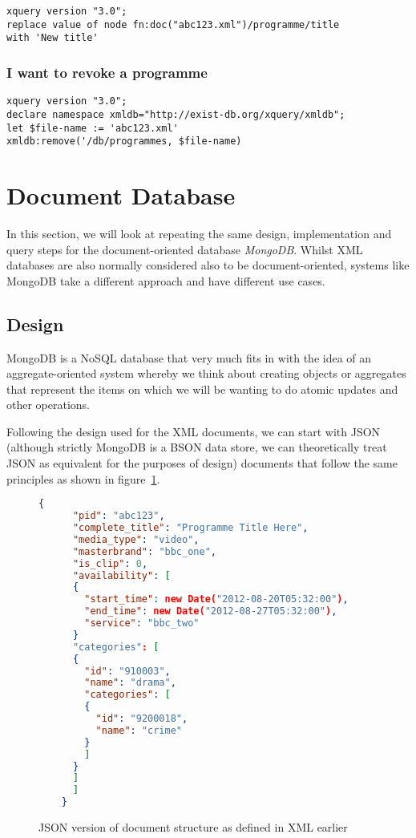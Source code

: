 \documentclass[11pt,a4paper]{article}
\begin{document}
\begin{lstlisting}
xquery version "3.0";
replace value of node fn:doc("abc123.xml")/programme/title
with 'New title'
\end{lstlisting}

\subsubsection{I want to revoke a programme}

\begin{lstlisting}
xquery version "3.0";
declare namespace xmldb="http://exist-db.org/xquery/xmldb";
let $file-name := 'abc123.xml'
xmldb:remove('/db/programmes, $file-name)
\end{lstlisting}


\section{Document Database}

In this section, we will look at repeating the same design, implementation
and query steps for the document-oriented database \emph{MongoDB}. Whilst
XML databases are also normally considered also to be document-oriented,
systems like MongoDB take a different approach and have different use
cases.

\subsection{Design}

MongoDB is a NoSQL database that very much fits in with the idea of
an aggregate-oriented system whereby we think about creating objects
or aggregates that represent the items on which we will be wanting
to do atomic updates and other operations.

Following the design used for the XML documents, we can start with
JSON (although strictly MongoDB is a BSON data store, we can theoretically
treat JSON as equivalent for the purposes of design)
documents that follow the same principles as shown in figure~\ref{fig:big-json-doc}.

\begin{figure}[p]
  \begin{lstlisting}[language=json]
    {
      "pid": "abc123",
      "complete_title": "Programme Title Here",
      "media_type": "video",
      "masterbrand": "bbc_one",
      "is_clip": 0,
      "availability": [
      {
        "start_time": new Date("2012-08-20T05:32:00"),
        "end_time": new Date("2012-08-27T05:32:00"),
        "service": "bbc_two"
      }
      "categories": [
      {
        "id": "910003",
        "name": "drama",
        "categories": [
        {
          "id": "9200018",
          "name": "crime"
        }
        ]
      }
      ]
      ]
    }
  \end{lstlisting}
  \caption{JSON version of document structure as defined in XML earlier}
  \label{fig:big-json-doc}
\end{figure}
\end{document}

